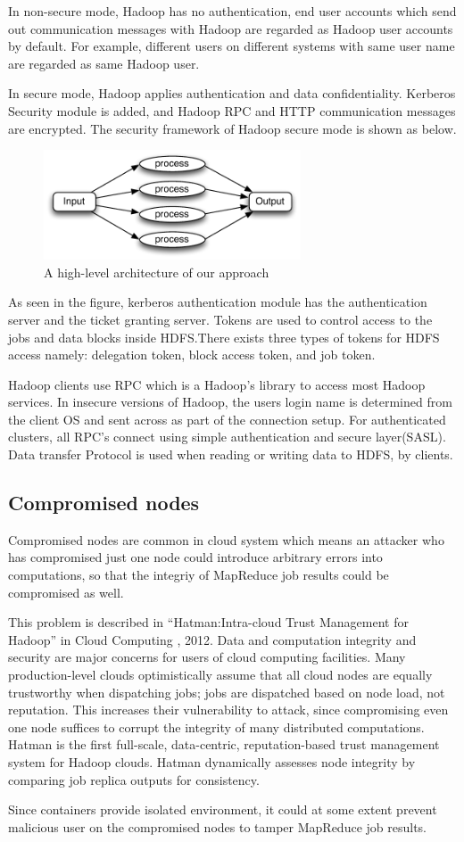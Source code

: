 In non-secure mode, Hadoop has no authentication, end user accounts which send out communication messages with Hadoop are regarded as Hadoop user accounts by default. For example, different users on different systems with same user name are regarded as same Hadoop user.

In secure mode, Hadoop applies authentication and data confidentiality. Kerberos Security module is added, and Hadoop RPC and HTTP communication messages are encrypted. The security framework of Hadoop secure mode is shown as below.

\begin{figure}[t]
  \centering
  \includegraphics[width=3in]{figs/overview}
  \caption{A high-level architecture of our approach}
  \label{fig:overview}
\end{figure}

As seen in the figure, kerberos authentication module has the authentication server and the ticket granting server. Tokens are used to control access to the jobs and data blocks inside HDFS.There exists three types of tokens for HDFS access namely: delegation token, block access token, and job token.

Hadoop clients use RPC which is a Hadoop’s library to access most Hadoop services. In insecure versions of Hadoop, the users login name is determined from the client OS and sent across as part of the connection setup. For authenticated clusters, all RPC’s connect using simple authentication and secure layer(SASL). Data transfer Protocol is used when reading or writing data to HDFS, by clients.

\subsection{Compromised nodes}

Compromised nodes are common in cloud system which means an attacker who has compromised just one node could introduce arbitrary errors into computations, so that the integriy of MapReduce job results could be compromised as well.

This problem is described in “Hatman:Intra-cloud Trust Management for Hadoop” in Cloud Computing , 2012.  Data and computation integrity and security are major concerns for users of cloud computing facilities. Many production-level clouds optimistically assume that all cloud nodes are equally trustworthy when dispatching jobs; jobs are dispatched based on node load, not reputation. This increases their vulnerability to attack, since compromising even one node suffices to corrupt the integrity of many distributed computations. Hatman is the first full-scale, data-centric, reputation-based trust management system for Hadoop clouds. Hatman dynamically assesses node integrity by comparing job replica outputs for consistency.

Since containers provide isolated environment, it could at some extent prevent malicious user on the compromised nodes to tamper MapReduce job results. 
